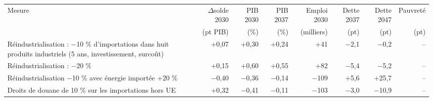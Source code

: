 \begin{tabular}{p{5.2cm}rrrrrrr}
\toprule
Mesure & $\Delta$solde 2030 & PIB 2030 & PIB 2037 & Emploi 2030 & Dette 2037 & Dette 2047 & Pauvreté \\
 & (pt PIB) & (\%) & (\%) & (milliers) & (pt) & (pt) & (pt) \\
\midrule
Réindustrialisation : −10 \% d'importations dans huit produits industriels (5 ans, investissement, surcoût) & +0{,}07 & +0{,}30 & +0{,}24 & +41 & $-$2{,}1 & $-$0{,}2 & -- \\
Réindustrialisation : −20 \% & +0{,}15 & +0{,}60 & +0{,}55 & +82 & $-$5{,}4 & $-$5{,}2 & -- \\
Réindustrialisation −10 \% avec énergie importée +20 \% & $-$0{,}40 & $-$0{,}36 & $-$0{,}14 & $-$109 & +5{,}6 & +25{,}7 & -- \\
Droits de douane de 10 \% sur les importations hors UE & +0{,}32 & $-$0{,}41 & $-$0{,}11 & $-$103 & $-$3{,}0 & $-$10{,}9 & -- \\
\bottomrule
\end{tabular}
